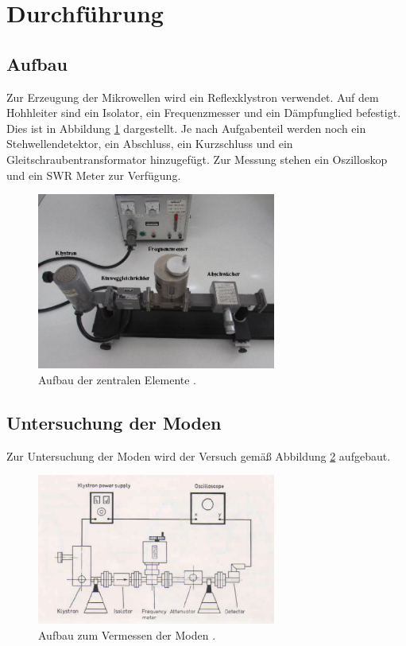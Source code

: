\section{Durchführung}
\label{sec:Durchführung}

\subsection{Aufbau}
\label{subsec:aufbau}

Zur Erzeugung der Mikrowellen wird ein Reflexklystron verwendet. Auf dem Hohhleiter
sind ein Isolator, ein Frequenzmesser und ein Dämpfunglied befestigt. Dies ist
in Abbildung \ref{fig:aufbau} dargestellt. Je nach
Aufgabenteil werden noch ein Stehwellendetektor, ein Abschluss, ein Kurzschluss
und ein Gleitschraubentransformator hinzugefügt. Zur Messung stehen ein Oszilloskop
und ein SWR Meter zur Verfügung.
\begin{figure}
  \centering
  \includegraphics[width=0.7\textwidth]{data/Aufbau.png}
  \caption{Aufbau der zentralen Elemente \cite{Versuchsanleitung_neu}.}
  \label{fig:aufbau}
\end{figure}


\subsection{Untersuchung der Moden}
\label{subsec:moden}
Zur Untersuchung der Moden wird der Versuch gemäß Abbildung \ref{fig:aufbau_mode}
aufgebaut.

\begin{figure}
  \centering
  \includegraphics[width=0.7\textwidth]{data/aufbau_mode.png}
  \caption{Aufbau zum Vermessen der Moden \cite{Versuchsanleitung_alt}.}
  \label{fig:aufbau_mode}
\end{figure}

